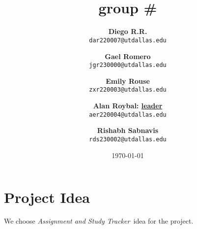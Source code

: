 \documentclass[12pt]{article}
\title{\groupname
\\ \small{group} \# \groupnumber}
\date{\today}
\author{
    \textbf{Diego R.R.} \\
    \texttt{dar220007@utdallas.edu} \\
    \and 
    \textbf{Gael Romero} \\
    \texttt{jgr230000@utdallas.edu} \\
    \and
    \textbf{Emily Rouse} \\
    \texttt{zxr220003@utdallas.edu} \\
    \and
    \textbf{Alan Roybal: \underline{leader}} \\
    \texttt{aer220004@utdallas.edu} \\
    \and
    \textbf{Rishabh Sabnavis} \\
    \texttt{rds230002@utdallas.edu}
}
\newcommand\projectname{\textit{Assignment and Study Tracker\ }}
\begin{document}
\maketitle

\section{Project Idea}
We choose \projectname idea for the project.
\end{document}
